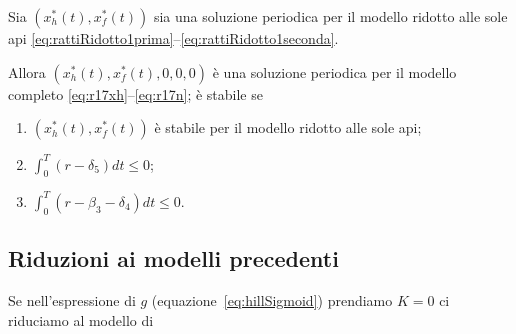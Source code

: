 \begin{proposizione}
    Sia $\left( x_h^*(t), x_f^*(t) \right)$ sia una soluzione periodica per il modello ridotto alle sole api \eqref{eq:rattiRidotto1prima}--\eqref{eq:rattiRidotto1seconda}.

    Allora $\left( x_h^*(t), x_f^*(t), 0, 0, 0 \right)$ è una soluzione periodica per il modello completo \eqref{eq:r17xh}--\eqref{eq:r17n}; è stabile se
    \begin{enumerate}
        \item $\left( x_h^*(t), x_f^*(t) \right)$ è stabile per il modello ridotto alle sole api;
        \item $\int_0^T (r - \delta_5) dt \leq 0$;
        \item $\int_0^T (r -\beta_3 - \delta_4) dt \leq 0$.
    \end{enumerate}
\end{proposizione}



\subsection{Riduzioni ai modelli precedenti}
Se nell'espressione di $g$ (equazione~\eqref{eq:hillSigmoid}) prendiamo $K=0$ ci riduciamo al modello di \cite{sumMar04}


